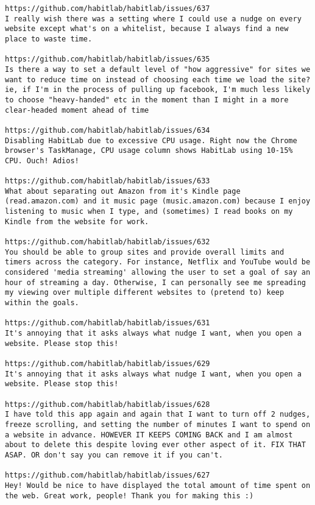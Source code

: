 \begin{lstlisting}[breaklines]
https://github.com/habitlab/habitlab/issues/637
I really wish there was a setting where I could use a nudge on every website except what's on a whitelist, because I always find a new place to waste time.

https://github.com/habitlab/habitlab/issues/635
Is there a way to set a default level of "how aggressive" for sites we want to reduce time on instead of choosing each time we load the site? ie, if I'm in the process of pulling up facebook, I'm much less likely to choose "heavy-handed" etc in the moment than I might in a more clear-headed moment ahead of time

https://github.com/habitlab/habitlab/issues/634
Disabling HabitLab due to excessive CPU usage. Right now the Chrome browser's TaskManage, CPU usage column shows HabitLab using 10-15% CPU. Ouch! Adios!

https://github.com/habitlab/habitlab/issues/633
What about separating out Amazon from it's Kindle page (read.amazon.com) and it music page (music.amazon.com) because I enjoy listening to music when I type, and (sometimes) I read books on my Kindle from the website for work.

https://github.com/habitlab/habitlab/issues/632
You should be able to group sites and provide overall limits and timers across the category. For instance, Netflix and YouTube would be considered 'media streaming' allowing the user to set a goal of say an hour of streaming a day. Otherwise, I can personally see me spreading my viewing over multiple different websites to (pretend to) keep within the goals.

https://github.com/habitlab/habitlab/issues/631
It's annoying that it asks always what nudge I want, when you open a website. Please stop this!

https://github.com/habitlab/habitlab/issues/629
It's annoying that it asks always what nudge I want, when you open a website. Please stop this!

https://github.com/habitlab/habitlab/issues/628
I have told this app again and again that I want to turn off 2 nudges, freeze scrolling, and setting the number of minutes I want to spend on a website in advance. HOWEVER IT KEEPS COMING BACK and I am almost about to delete this despite loving ever other aspect of it. FIX THAT ASAP. OR don't say you can remove it if you can't.

https://github.com/habitlab/habitlab/issues/627
Hey! Would be nice to have displayed the total amount of time spent on the web. Great work, people! Thank you for making this :)


\end{lstlisting}
